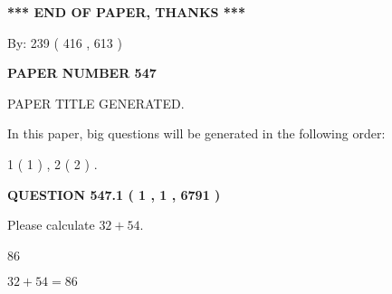 \documentclass[12pt]{article}
\begin{document}
   
\vspace{1.0in} 
{\textbf{\large{ *** END OF PAPER, THANKS *** }}} 
   
   
\hspace{1.0in} By: 
 239 ( 416 ,  613 )
   
   
   
   
\newpage 
\setcounter{page}{ 
   547001 } 
   
   
   
   
 {\textbf{ \Large{ PAPER NUMBER  547  }}}
   
   
\vspace{0.2in}
   
   
   
   
   
   
   
   
 \vspace{0.2in}
 
 
 
 
   
   
 PAPER TITLE GENERATED.
   
   
   
\vspace{0.2in}
   
In this paper, big questions will be generated in the following order: 
   
   
   1 ( 1 )
 ,
   2 ( 2 )
 .
  
\vspace{0.2in}
  
{\textbf{\Large{QUESTION
547.1 
 ( 1 , 1 , 6791 )
}}}
  
  
 
Please calculate $ %
32 +  %
54 $.
 
 
 
\noindent{}
 
 

86
 
 
\noindent{}
 
 

 
 
 
\noindent{}
 
 

$ %
32 +  %
54=   %
86$
 
\end{document}
